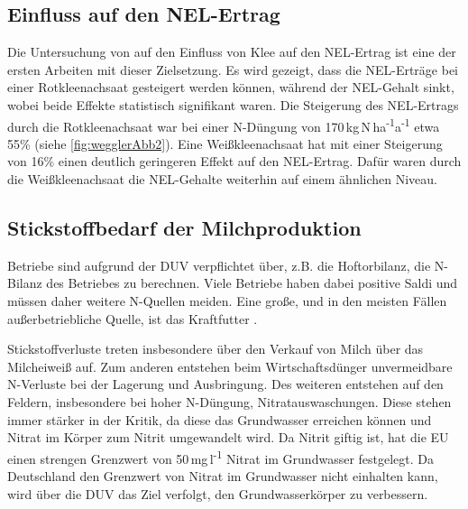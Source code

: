 \subsection{Einfluss auf den \acl{NEL}-Ertrag}
\label{subsec:NEL}
Die Untersuchung von \textcite{weggler2050leguminosen} auf den Einfluss von Klee auf den \ac{NEL}-Ertrag ist eine der ersten Arbeiten mit dieser Zielsetzung.
Es wird gezeigt, dass die \ac{NEL}-Erträge bei einer Rotkleenachsaat gesteigert werden können, während der \ac{NEL}-Gehalt sinkt, wobei beide Effekte statistisch signifikant waren.
Die Steigerung des \ac{NEL}-Ertrags durch die Rotkleenachsaat war bei einer N-Düngung von 170\,kg\,N\,ha\textsuperscript{-1}a\textsuperscript{-1} etwa 55\% (siehe \cref{fig:wegglerAbb2}).
Eine Weißkleenachsaat hat mit einer Steigerung von 16\% einen deutlich geringeren Effekt auf den \ac{NEL}-Ertrag.
Dafür waren durch die Weißkleenachsaat die \ac{NEL}-Gehalte weiterhin auf einem ähnlichen Niveau.


\subsection{Stickstoffbedarf der Milchproduktion}
\label{subsec:Stickstoff}
Betriebe sind aufgrund der \ac{DUV} verpflichtet über, z.B. die Hoftorbilanz, die N-Bilanz des Betriebes zu berechnen.
Viele Betriebe haben dabei positive Saldi \parencite[7ff.]{lellmann2005untersuchungen} und müssen daher weitere N-Quellen meiden.
Eine große, und in den meisten Fällen außerbetriebliche Quelle, ist das Kraftfutter \parencite[62]{lellmann2005untersuchungen}.

Stickstoffverluste treten insbesondere über den Verkauf von Milch über das Milcheiweiß auf. 
Zum anderen entstehen beim Wirtschaftsdünger unvermeidbare N-Verluste bei der Lagerung und Ausbringung.
Des weiteren entstehen auf den Feldern, insbesondere bei hoher N-Düngung, Nitratauswaschungen.
Diese stehen immer stärker in der Kritik, da diese das Grundwasser erreichen können und Nitrat im Körper zum Nitrit umgewandelt wird.
Da Nitrit giftig ist, hat die \ac{EU} einen strengen Grenzwert von 50\,mg\,l\textsuperscript{-1} Nitrat im Grundwasser festgelegt.
Da Deutschland den Grenzwert von Nitrat im Grundwasser nicht einhalten kann, wird über die \ac{DUV} das Ziel verfolgt, den Grundwasserkörper zu verbessern.


